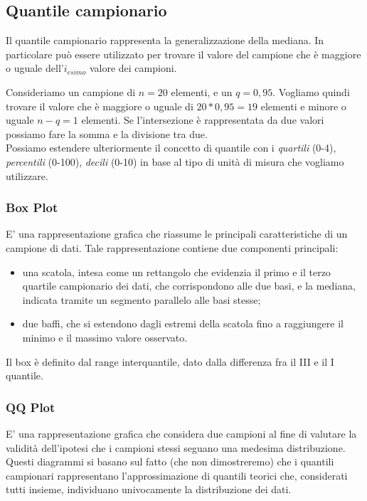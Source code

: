 \subsection{Quantile campionario}
Il quantile campionario rappresenta la generalizzazione della mediana. In particolare può essere utilizzato per trovare il valore del campione che è maggiore o uguale dell'$i_{esimo}$ valore dei campioni. 

Consideriamo un campione di $n = 20$ elementi, e un $q = 0,95$. Vogliamo quindi trovare il valore che è maggiore o uguale di $20 * 0,95 = 19$ elementi e minore o uguale $n - q = 1$ elementi. Se l'intersezione è rappresentata da due valori possiamo fare la somma e la divisione tra due.\\

Possiamo estendere ulteriormente il concetto di quantile con i \emph{quartili} (0-4), \emph{percentili} (0-100), \emph{decili} (0-10) in base al tipo di unità di misura che vogliamo utilizzare.

\subsubsection{Box Plot} 
E' una rappresentazione grafica che riassume le principali caratteristiche di un campione di dati. Tale rappresentazione contiene due componenti principali:
\begin{itemize}
\item una scatola, intesa come un rettangolo che evidenzia il primo e il terzo quartile campionario dei dati, che corrispondono alle due basi, e la mediana, indicata tramite un segmento parallelo alle basi stesse;
\item due baﬀi, che si estendono dagli estremi della scatola fino a raggiungere il minimo e il massimo valore osservato.
\end{itemize}
Il box è definito dal range interquantile, dato dalla differenza fra il III e il I quantile.

\subsubsection{QQ Plot} 

E' una rappresentazione grafica che considera due campioni al fine di valutare la validità dell’ipotesi che i campioni stessi seguano una medesima distribuzione. Questi diagrammi si basano sul fatto (che non dimostreremo) che i quantili campionari rappresentano l’approssimazione di quantili teorici che, considerati tutti insieme, individuano univocamente la distribuzione dei dati.


